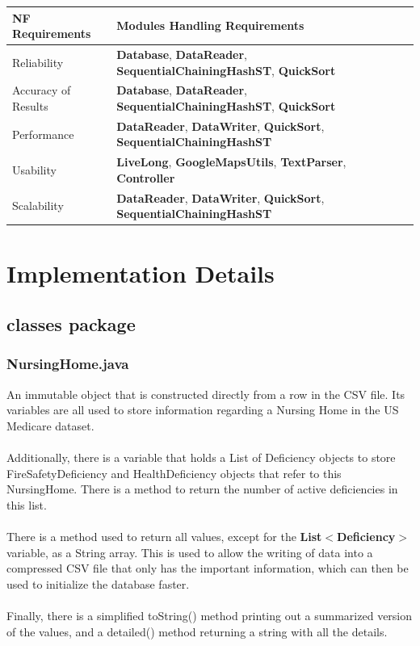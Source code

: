 \documentclass[12pt]{article}
\begin{document}
\bigskip

\begin{center}
\begin{tabular}{|ll|}
\hline
NF Requirements & Modules Handling Requirements \\
\hline
Reliability & \textbf{Database}, \textbf{DataReader}, \textbf{SequentialChainingHashST}, \textbf{QuickSort}\\
\hline
Accuracy of Results & \textbf{Database}, \textbf{DataReader}, \textbf{SequentialChainingHashST}, \textbf{QuickSort}\\
\hline
Performance & \textbf{DataReader}, \textbf{DataWriter}, \textbf{QuickSort}, \textbf{SequentialChainingHashST}\\
\hline
Usability & \textbf{LiveLong}, \textbf{GoogleMapsUtils}, \textbf{TextParser}, \textbf{Controller}\\
\hline
Scalability &  \textbf{DataReader}, \textbf{DataWriter}, \textbf{QuickSort}, \textbf{SequentialChainingHashST}\\
\hline
\end{tabular}
\end{center}













\newpage
\section{Implementation Details}
\subsection{classes package}
\subsubsection{NursingHome.java}
An immutable object that is constructed directly from a row in the CSV file. Its variables are all used to store information regarding a Nursing Home in the US Medicare dataset. \\ \\
Additionally, there is a variable that holds a List of Deficiency objects to store FireSafetyDeficiency and HealthDeficiency objects that refer to this NursingHome. There is a method to return the number of active deficiencies in this list. \\ \\
There is a method used to return all values, except for the \textbf{List$<$Deficiency$>$} variable, as a String array. This is used to allow the writing of data into a compressed CSV file that only has the important information, which can then be used to initialize the database faster. \\ \\
Finally, there is a simplified toString() method printing out a summarized version of the values, and a detailed() method returning a string with all the details.
\end{document}
